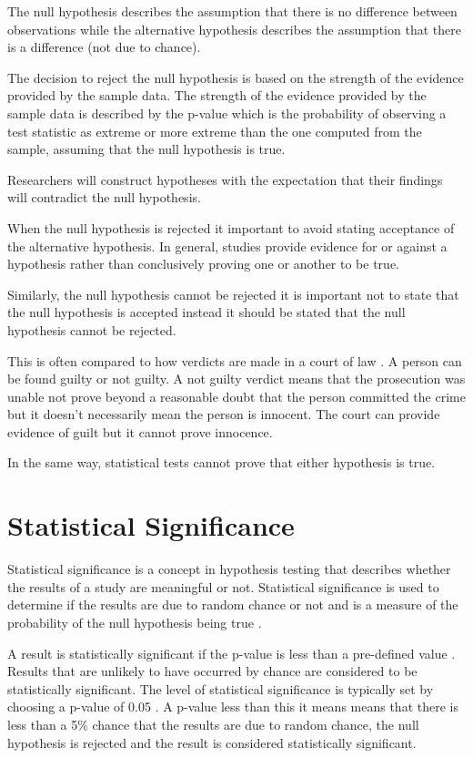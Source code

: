 \documentclass[
]{book}
\begin{document}
The null hypothesis describes the assumption that there is no difference between observations while the alternative hypothesis describes the assumption that there is a difference (not due to chance).

The decision to reject the null hypothesis is based on the strength of the evidence provided by the sample data. The strength of the evidence provided by the sample data is described by the p-value which is the probability of observing a test statistic as extreme or more extreme than the one computed from the sample, assuming that the null hypothesis is true.

Researchers will construct hypotheses with the expectation that their findings will contradict the null hypothesis.

When the null hypothesis is rejected it important to avoid stating acceptance of the alternative hypothesis. In general, studies provide evidence for or against a hypothesis rather than conclusively proving one or another to be true.

Similarly, the null hypothesis cannot be rejected it is important not to state that the null hypothesis is accepted instead it should be stated that the null hypothesis cannot be rejected.

This is often compared to how verdicts are made in a court of law \citep{banerjee}. A person can be found guilty or not guilty. A not guilty verdict means that the prosecution was unable not prove beyond a reasonable doubt that the person committed the crime but it doesn't necessarily mean the person is innocent. The court can provide evidence of guilt but it cannot prove innocence.

In the same way, statistical tests cannot prove that either hypothesis is true.

\hypertarget{statistical-significance}{%
\section{Statistical Significance}\label{statistical-significance}}

Statistical significance is a concept in hypothesis testing that describes whether the results of a study are meaningful or not. Statistical significance is used to determine if the results are due to random chance or not and is a measure of the probability of the null hypothesis being true \citep{tenny2}.

A result is statistically significant if the p-value is less than a pre-defined value \citep{tenny2}. Results that are unlikely to have occurred by chance are considered to be statistically significant. The level of statistical significance is typically set by choosing a p-value of 0.05 \citep{uncertainty}. A p-value less than this it means means that there is less than a 5\% chance that the results are due to random chance, the null hypothesis is rejected and the result is considered statistically significant.
\end{document}
